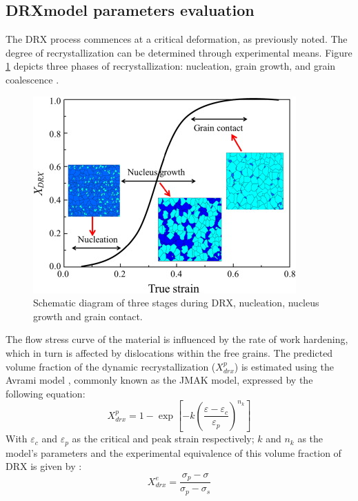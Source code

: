 \documentclass[metals,article,submit,pdftex,moreauthors]{Definitions/mdpi}
\begin{document}
\subsection{DRXmodel parameters evaluation\label{subsec:DRXparams}}

The DRX process commences at a critical deformation, as previously noted.
The degree of recrystallization can be determined through experimental means.
Figure \ref{fig:DRXschema} depicts three phases of recrystallization: nucleation, grain growth, and grain coalescence  \cite{wan2017experimental}.

\begin{figure}[!ht]
\centering
\includegraphics[width=0.7\columnwidth]{Figures/picDRX}
\caption{Schematic diagram of three stages during DRX, nucleation, nucleus growth and grain contact.}
\label{fig:DRXschema}
\end{figure}

The flow stress curve of the material is influenced by the rate of work hardening, which in turn is affected by dislocations within the free grains.
The predicted volume fraction of the dynamic recrystallization ($X_{drx}^{p}$) is estimated using the Avrami model \cite{wan2017experimental}, commonly known as the JMAK model, expressed by the following equation:
\begin{equation}
X_{drx}^{p} = 1 - \exp\left[ -k\left(\frac{\varepsilon - \varepsilon_c}{\varepsilon_p}\right)^{n_k}\right]
\label{eq:drxpred}
\end{equation}
With $\varepsilon_c$ and $\varepsilon_p$ as the critical and peak strain respectively; $k$ and $n_k$ as the model's parameters and the experimental equivalence of this volume fraction of DRX is given by :
\begin{equation}
X_{drx}^{e} = \frac{\sigma_p-\sigma}{\sigma_p-\sigma_{s}}
\label{eq:drxexp}
\end{equation}
\end{document}
